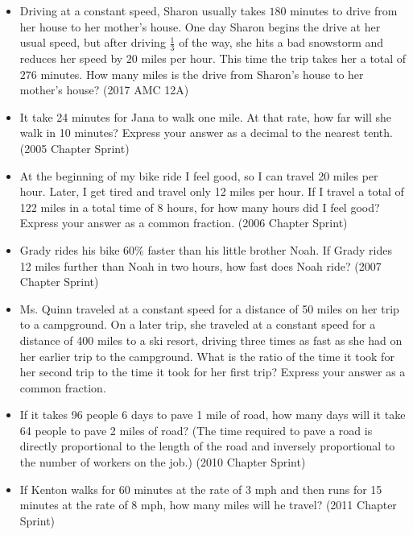 \documentclass{article}
\begin{document}
\begin{itemize}

\item Driving at a constant speed, Sharon usually takes $180$ minutes to drive from her house to her mother's house. One day Sharon begins the drive at her usual speed, but after driving $\frac{1}{3}$ of the way, she hits a bad snowstorm and reduces her speed by $20$ miles per hour. This time the trip takes her a total of $276$ minutes. How many miles is the drive from Sharon's house to her mother's house? (2017 AMC 12A)


\item It take 24 minutes for Jana to walk one mile. At that rate, how far will she walk in 10 minutes? Express your answer as a decimal to the nearest tenth. (2005 Chapter Sprint)

\item At the beginning of my bike ride I feel good, so I can travel 20 miles per hour. Later, I get tired and travel only 12 miles per hour. If I travel a total of 122 miles in a total time of 8 hours, for how many hours did I feel good? Express your answer as a common fraction. (2006 Chapter Sprint)

\item Grady rides his bike $60\%$ faster than his little brother Noah. If Grady rides 12 miles further than Noah in two hours, how fast does Noah ride? (2007 Chapter Sprint)

\item Ms. Quinn traveled at a constant speed for a distance of 50 miles on her trip to a campground. On a later trip, she traveled at a constant speed for a distance of 400 miles to a ski resort, driving three times as fast as she had on her earlier trip to the campground. What is the ratio of the time it took for her second trip to the time it took for her first trip? Express your answer as a common fraction.

\item If it takes 96 people 6 days to pave 1 mile of road, how many days will it take 64 people to pave 2 miles of road? (The time required to pave a road is directly proportional to the length of the road and inversely proportional to the number of workers on the job.) (2010 Chapter Sprint)

\item If Kenton walks for 60 minutes at the rate of 3 mph and then runs for 15 minutes at the rate of 8 mph, how many miles will he travel? (2011 Chapter Sprint)


\end{itemize}
\end{document}
